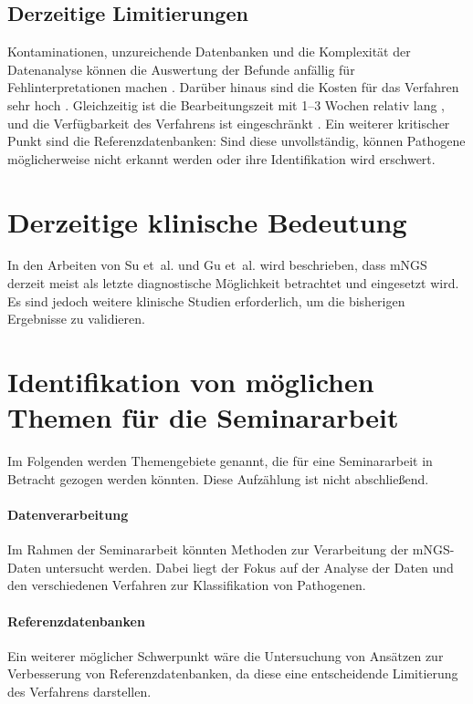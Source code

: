 \documentclass[a4paper, conference]{IEEEtran}
\begin{document}
\subsection{Derzeitige Limitierungen}
Kontaminationen, unzureichende Datenbanken und die Komplexität der Datenanalyse können die Auswertung der Befunde anfällig für Fehlinterpretationen machen \cite{clinicalMetagenomicNextGenerationSequencing, weiGuSteveMillerCharlesChiuMNGSPathogenDetection}. Darüber hinaus sind die Kosten für das Verfahren sehr hoch \cite{clinicalMetagenomicNextGenerationSequencing, weiGuSteveMillerCharlesChiuMNGSPathogenDetection}. Gleichzeitig ist die Bearbeitungszeit mit 1--3 Wochen relativ lang \cite{clinicalMetagenomicNextGenerationSequencing}, und die Verfügbarkeit des Verfahrens ist eingeschränkt \cite{clinicalMetagenomicNextGenerationSequencing}. Ein weiterer kritischer Punkt sind die Referenzdatenbanken: Sind diese unvollständig, können Pathogene möglicherweise nicht erkannt werden oder ihre Identifikation wird erschwert.

\section{Derzeitige klinische Bedeutung}
In den Arbeiten von Su et~al. \cite{clinicalMetagenomicNextGenerationSequencing} und Gu et~al. \cite{weiGuSteveMillerCharlesChiuMNGSPathogenDetection} wird beschrieben, dass mNGS derzeit meist als letzte diagnostische Möglichkeit betrachtet und eingesetzt wird. Es sind jedoch weitere klinische Studien erforderlich, um die bisherigen Ergebnisse zu validieren.

\section{Identifikation von möglichen Themen für die Seminararbeit}
Im Folgenden werden Themengebiete genannt, die für eine Seminararbeit in Betracht gezogen werden könnten. Diese Aufzählung ist nicht abschließend.

\paragraph{Datenverarbeitung}
Im Rahmen der Seminararbeit könnten Methoden zur Verarbeitung der mNGS-Daten untersucht werden. Dabei liegt der Fokus auf der Analyse der Daten und den verschiedenen Verfahren zur Klassifikation von Pathogenen.

\paragraph{Referenzdatenbanken}
Ein weiterer möglicher Schwerpunkt wäre die Untersuchung von Ansätzen zur Verbesserung von Referenzdatenbanken, da diese eine entscheidende Limitierung des Verfahrens darstellen.
\end{document}
